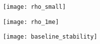 \begin{frame}
\begin{figure}
\texttt{[image: rho\_small]}
\end{figure}
\end{frame}

\begin{frame}
\begin{figure}
\texttt{[image: rho\_1me]}
\end{figure}
\end{frame}

\begin{frame}
\begin{figure}
\texttt{[image: baseline\_stability]}
\end{figure}
\end{frame}
